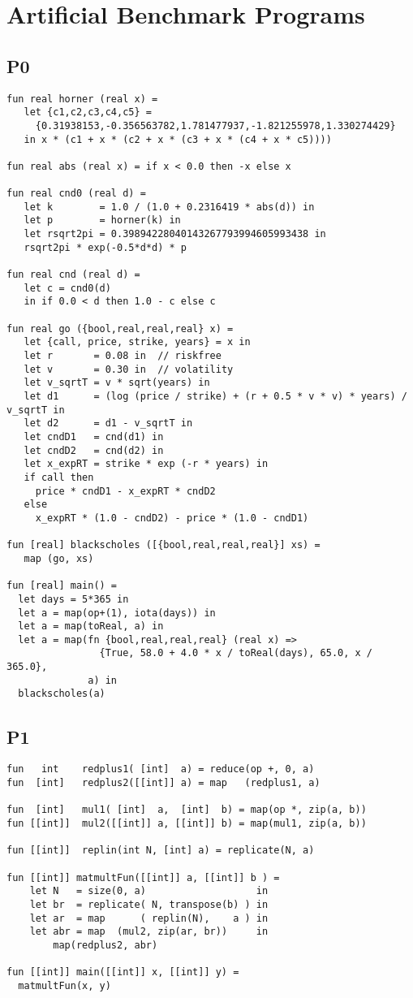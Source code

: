 \chapter{Artificial Benchmark Programs}
\label{app:artificial-benchmark-programs}

\section{P0}
\begin{verbatim}
fun real horner (real x) =
   let {c1,c2,c3,c4,c5} =
     {0.31938153,-0.356563782,1.781477937,-1.821255978,1.330274429}
   in x * (c1 + x * (c2 + x * (c3 + x * (c4 + x * c5))))

fun real abs (real x) = if x < 0.0 then -x else x

fun real cnd0 (real d) =
   let k        = 1.0 / (1.0 + 0.2316419 * abs(d)) in
   let p        = horner(k) in
   let rsqrt2pi = 0.39894228040143267793994605993438 in
   rsqrt2pi * exp(-0.5*d*d) * p

fun real cnd (real d) =
   let c = cnd0(d)
   in if 0.0 < d then 1.0 - c else c

fun real go ({bool,real,real,real} x) =
   let {call, price, strike, years} = x in
   let r       = 0.08 in  // riskfree
   let v       = 0.30 in  // volatility
   let v_sqrtT = v * sqrt(years) in
   let d1      = (log (price / strike) + (r + 0.5 * v * v) * years) / v_sqrtT in
   let d2      = d1 - v_sqrtT in
   let cndD1   = cnd(d1) in
   let cndD2   = cnd(d2) in
   let x_expRT = strike * exp (-r * years) in
   if call then
     price * cndD1 - x_expRT * cndD2
   else
     x_expRT * (1.0 - cndD2) - price * (1.0 - cndD1)

fun [real] blackscholes ([{bool,real,real,real}] xs) =
   map (go, xs)

fun [real] main() =
  let days = 5*365 in
  let a = map(op+(1), iota(days)) in
  let a = map(toReal, a) in
  let a = map(fn {bool,real,real,real} (real x) =>
                {True, 58.0 + 4.0 * x / toReal(days), 65.0, x / 365.0},
              a) in
  blackscholes(a)
\end{verbatim}

\section{P1}
\begin{verbatim}
fun   int    redplus1( [int]  a) = reduce(op +, 0, a)
fun  [int]   redplus2([[int]] a) = map   (redplus1, a)

fun  [int]   mul1( [int]  a,  [int]  b) = map(op *, zip(a, b))
fun [[int]]  mul2([[int]] a, [[int]] b) = map(mul1, zip(a, b))

fun [[int]]  replin(int N, [int] a) = replicate(N, a)

fun [[int]] matmultFun([[int]] a, [[int]] b ) =
    let N   = size(0, a)                   in
    let br  = replicate( N, transpose(b) ) in
    let ar  = map      ( replin(N),    a ) in
    let abr = map  (mul2, zip(ar, br))     in
        map(redplus2, abr)

fun [[int]] main([[int]] x, [[int]] y) =
  matmultFun(x, y)
\end{verbatim}

